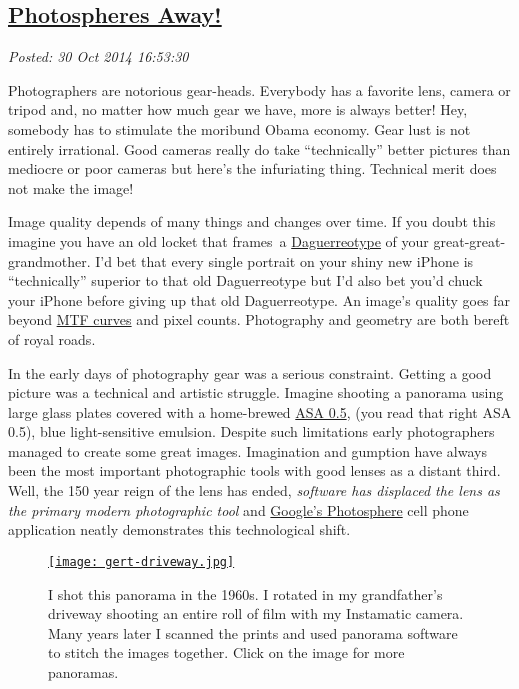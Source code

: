 %

\subsection*{\href{https://bakerjd99.wordpress.com/2014/10/30/photospheres-away-2/}{Photospheres Away!}}


\noindent\emph{Posted: 30 Oct 2014 16:53:30}
\vspace{6pt}

Photographers are notorious gear-heads. Everybody has a favorite lens,
camera or tripod and, no matter how much gear we have, more is always
better! Hey, somebody has to stimulate the moribund Obama economy. Gear
lust is not entirely irrational. Good cameras really do take
``technically'' better pictures than mediocre or poor cameras but here's
the infuriating thing. Technical merit does not make the image!

Image quality depends of many things and changes over time. If you doubt
this imagine you have an old locket that frames~a
\href{https://en.wikipedia.org/wiki/Daguerreotype}{Daguerreotype} of
your great-great-grandmother. I'd bet that every single portrait on your
shiny new iPhone is ``technically'' superior to that old Daguerreotype
but I'd also bet you'd chuck your iPhone before giving up that old
Daguerreotype. An image's quality goes far beyond
\href{http://photographylife.com/how-to-read-mtf-charts}{MTF curves} and
pixel counts. Photography and geometry are both bereft of royal roads.

In the early days of photography gear was a serious constraint. Getting
a good picture was a technical and artistic struggle. Imagine shooting a
panorama using large glass plates covered with a home-brewed
\href{http://www.alternativephotography.com/wp/processes/gelatin-silver/silver-gelatin-dry-plate-process}{ASA
0.5}, (you read that right ASA 0.5), blue light-sensitive emulsion.
Despite such limitations early photographers managed to create some
great images. Imagination and gumption have always been the most
important photographic tools with good lenses as a distant third. Well,
the 150 year reign of the lens has ended, \emph{software has displaced
the lens as the primary modern photographic tool} and
\href{https://itunes.apple.com/us/app/photo-sphere-camera/id904418768}{Google's
Photosphere} cell phone application neatly demonstrates this
technological shift.

\captionsetup[figure]{labelformat=empty}
\begin{figure}[htbp]
\centering
\href{http://conceptcontrol.smugmug.com/Themes/Manipulations/Panoramas-1}{\texttt{[image: gert-driveway.jpg]}}
\caption[I shot this panorama in the 1960s. I rotated in my grandfather's
driveway shooting an entire roll of film]{I shot this panorama in the 1960s. I rotated in my grandfather's
driveway shooting an entire roll of film with my Instamatic camera. Many
years later I scanned the prints and used panorama software to stitch
the images together. Click on the image for more
panoramas.}
\label{fig:4832X0}
\end{figure}


